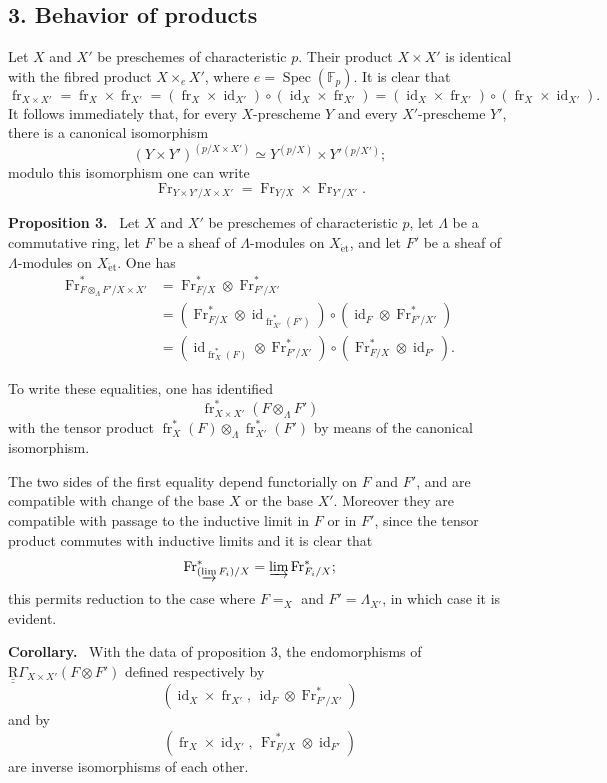 \documentclass[11pt]{article}
\newenvironment{statement}[1]{\par\medskip\noindent\textbf{#1.}\ }{\par\medskip}
\DeclareMathOperator{\Spec}{Spec}
\providecommand{\et}{\mathrm{\acute{e}t}}
\providecommand{\id}{\operatorname{id}}
\providecommand{\id}{\operatorname{id}}
\providecommand{\id}{\operatorname{id}}
\providecommand{\id}{\operatorname{id}}
\providecommand{\Spec}{\operatorname{Spec}}
\providecommand{\Spec}{\operatorname{Spec}}
\providecommand{\id}{\operatorname{id}}
\providecommand{\Spec}{\operatorname{Spec}}
\providecommand{\fr}{\operatorname{fr}}
\providecommand{\Fr}{\operatorname{Fr}}
\providecommand{\Fr}{\operatorname{Fr}}
\providecommand{\fr}{\operatorname{fr}}
\providecommand{\Spec}{\operatorname{Spec}}
\providecommand{\id}{\operatorname{id}}
\providecommand{\et}{\acute{e}t}
\begin{document}
\subsection*{3. Behavior of products}

Let $X$ and $X'$ be preschemes of characteristic $p$. Their product $X\times X'$ is identical with the fibred product $X\times_eX'$, where $e=\Spec(\mathbb F_p)$. It is clear that
\[
\fr_{X\times X'}=\fr_X\times\fr_{X'}=(\fr_X\times\id_{X'})\circ(\id_X\times\fr_{X'})
=(\id_X\times\fr_{X'})\circ(\fr_X\times\id_{X'}).
\]
It follows immediately that, for every $X$-prescheme $Y$ and every $X'$-prescheme $Y'$, there is a canonical isomorphism
\[
(Y\times Y')^{(p/X\times X')}
\simeq Y^{(p/X)}\times Y'{}^{(p/X')};
\]
modulo this isomorphism one can write
\[
\Fr_{Y\times Y'/X\times X'}=\Fr_{Y/X}\times\Fr_{Y'/X'}.
\]

\begin{statement}{Proposition 3}
Let $X$ and $X'$ be preschemes of characteristic $p$, let $\Lambda$ be a commutative ring, let $F$ be a sheaf of $\Lambda$-modules on $X_{\et}$, and let $F'$ be a sheaf of $\Lambda$-modules on $X_{\et}$. One has
\[
\begin{aligned}
\Fr^*_{F\otimes_\Lambda F'/X\times X'}
&=\Fr^*_{F/X}\otimes\Fr^*_{F'/X'}\\
&=(\Fr^*_{F/X}\otimes\id_{\fr_{X'}^*(F')})
  \circ(\id_F\otimes\Fr^*_{F'/X'})\\
&=(\id_{\fr_X^*(F)}\otimes\Fr^*_{F'/X'})
  \circ(\Fr^*_{F/X}\otimes\id_{F'}).
\end{aligned}
\]
\end{statement}

To write these equalities, one has identified
\[
\fr_{X\times X'}^*(F\otimes_\Lambda F')
\]
with the tensor product $\fr_X^*(F)\otimes_\Lambda\fr_{X'}^*(F')$ by means of the canonical isomorphism.

The two sides of the first equality depend functorially on $F$ and $F'$, and are compatible with change of the base $X$ or the base $X'$. Moreover they are compatible with passage to the inductive limit in $F$ or in $F'$, since the tensor product commutes with inductive limits and it is clear that
\[
\Fr^*_{(\varinjlim F_i)/X}=\varinjlim\Fr^*_{F_i/X};
\]
this permits reduction to the case where $F=_X$ and $F'=\Lambda_{X'}$, in which case it is evident.

\begin{statement}{Corollary}
With the data of proposition 3, the endomorphisms of $\underline{\underline{\mathrm{R}}}\Gamma_{X\times X'}(F\otimes F')$ defined respectively by
\[
(\id_X\times\fr_{X'},\,\id_F\otimes\Fr^*_{F'/X'})
\]
and by
\[
(\fr_X\times\id_{X'},\,\Fr^*_{F/X}\otimes\id_{F'})
\]
are inverse isomorphisms of each other.
\end{statement}
\end{document}
